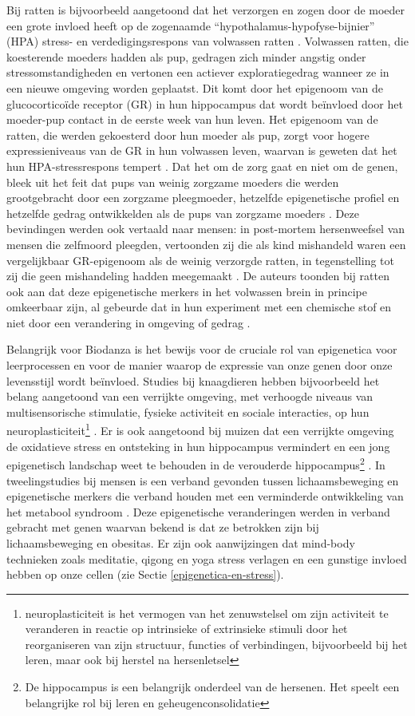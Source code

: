 \documentclass[
  11pt,
]{book}
\begin{document}
Bij ratten is bijvoorbeeld aangetoond dat het verzorgen en zogen door de moeder een grote invloed heeft op de zogenaamde ``hypothalamus-hypofyse-bijnier'' (HPA) stress- en verdedigingsrespons van volwassen ratten \citep{Meaney2004}. Volwassen ratten, die koesterende moeders hadden als pup, gedragen zich minder angstig onder stressomstandigheden en vertonen een actiever exploratiegedrag wanneer ze in een nieuwe omgeving worden geplaatst. Dit komt door het epigenoom van de glucocorticoïde receptor (GR) in hun hippocampus dat wordt beïnvloed door het moeder-pup contact in de eerste week van hun leven. Het epigenoom van de ratten, die werden gekoesterd door hun moeder als pup, zorgt voor hogere expressieniveaus van de GR in hun volwassen leven, waarvan is geweten dat het hun HPA-stressrespons tempert \citep{Meaney2004, Meaney2005}. Dat het om de zorg gaat en niet om de genen, bleek uit het feit dat pups van weinig zorgzame moeders die werden grootgebracht door een zorgzame pleegmoeder, hetzelfde epigenetische profiel en hetzelfde gedrag ontwikkelden als de pups van zorgzame moeders \citep{Meaney2004}. Deze bevindingen werden ook vertaald naar mensen: in post-mortem hersenweefsel van mensen die zelfmoord pleegden, vertoonden zij die als kind mishandeld waren een vergelijkbaar GR-epigenoom als de weinig verzorgde ratten, in tegenstelling tot zij die geen mishandeling hadden meegemaakt \citep{Meaney2009}. De auteurs toonden bij ratten ook aan dat deze epigenetische merkers in het volwassen brein in principe omkeerbaar zijn, al gebeurde dat in hun experiment met een chemische stof en niet door een verandering in omgeving of gedrag \citep{Meaney2005}.

Belangrijk voor Biodanza is het bewijs voor de cruciale rol van epigenetica voor leerprocessen en voor de manier waarop de expressie van onze genen door onze levensstijl wordt beïnvloed.
Studies bij knaagdieren hebben bijvoorbeeld het belang aangetoond van een verrijkte omgeving, met verhoogde niveaus van multisensorische stimulatie, fysieke activiteit en sociale interacties, op hun neuroplasticiteit\footnote{neuroplasticiteit is het vermogen van het zenuwstelsel om zijn activiteit te veranderen in reactie op intrinsieke of extrinsieke stimuli door het reorganiseren van zijn structuur, functies of verbindingen, bijvoorbeeld bij het leren, maar ook bij herstel na hersenletsel} \citep{baroncelli2010}. Er is ook aangetoond bij muizen dat een verrijkte omgeving de oxidatieve stress en ontsteking in hun hippocampus vermindert \citep{grinan2016} en een jong epigenetisch landschap weet te behouden in de verouderde hippocampus\footnote{De hippocampus is een belangrijk onderdeel van de hersenen. Het speelt een belangrijke rol bij leren en geheugenconsolidatie} \citep{zocher2021}.
In tweelingstudies bij mensen is een verband gevonden tussen lichaamsbeweging en epigenetische merkers die verband houden met een verminderde ontwikkeling van het metabool syndroom \citep{Duncan2022}. Deze epigenetische veranderingen werden in verband gebracht met genen waarvan bekend is dat ze betrokken zijn bij lichaamsbeweging en obesitas. Er zijn ook aanwijzingen dat mind-body technieken zoals meditatie, qigong en yoga stress verlagen en een gunstige invloed hebben op onze cellen (zie Sectie \ref{epigenetica-en-stress}).
\end{document}

